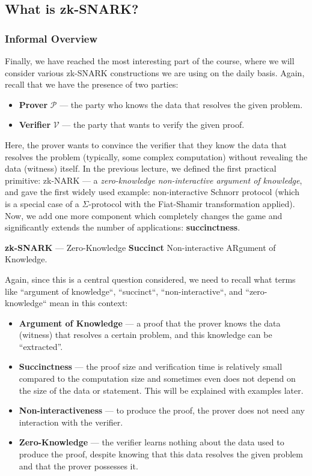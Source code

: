 \documentclass[../../book.tex]{subfiles}
\begin{document}
\subsection{What is zk-SNARK?}

\subsubsection{Informal Overview}

Finally, we have reached the most interesting part of the course, where we will consider various zk-SNARK constructions we are using on the daily basis. Again, recall that we have the presence of two parties:
\begin{itemize}
    \item \textbf{Prover} $\mathcal{P}$ --- the party who knows the data that resolves the given problem.
    \item \textbf{Verifier} $\mathcal{V}$ --- the party that wants to verify the given proof.
\end{itemize}

Here, the prover wants to convince the verifier that they know the data that resolves the problem (typically, some complex computation) without revealing the data (witness) itself. In the previous lecture, we defined the first practical primitive: zk-NARK --- a \textit{zero-knowledge non-interactive argument of knowledge}, and gave the first widely used example: non-interactive Schnorr protocol (which is a special case of a $\Sigma$-protocol with the Fiat-Shamir transformation applied). Now, we add one more component which completely changes the game and significantly extends the number of applications: \textbf{succinctness}.

\begin{definition}
    \textbf{zk-SNARK} --- Zero-Knowledge \textbf{Succinct} Non-interactive ARgument of Knowledge.
\end{definition}

Again, since this is a central question considered, we need to recall what terms like ``argument of knowledge``, ``succinct``, ``non-interactive``, and 
``zero-knowledge`` mean in this context:

\begin{itemize}
    \item \textbf{Argument of Knowledge} --- a proof that the prover knows the data (witness) that resolves a certain
    problem, and this knowledge can be ``extracted''.
    \item \textbf{Succinctness} --- the proof size and verification time is relatively small compared to the computation size and sometimes even does not depend on the size of 
    the data or statement. This will be explained with examples later.
    \item \textbf{Non-interactiveness} --- to produce the proof, the prover does not need any interaction
    with the verifier.
    \item \textbf{Zero-Knowledge} --- the verifier learns nothing about the data used to produce the
    proof, despite knowing that this data resolves the given problem and that the prover possesses it.
\end{itemize}
\end{document}
